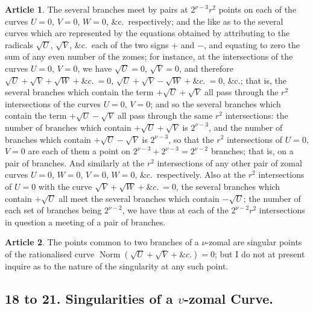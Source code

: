 \documentclass[11pt,a4paper]{article}
\theoremstyle{definition}
\newtheorem{art}{Article}
\DeclareMathOperator{\Norm}{Norm}
\newcommand{\norm}{\Norm}
\begin{document}
\begin{art}
The several branches meet by pairs at $2^{\nu-3}r^{2}$ points on each of the curves $U = 0$, $V = 0$, $W = 0$, \&c.\ respectively; and the like as to the several curves which are represented by the equations obtained by attributing to the radicals $\sqrt{U}$, $\sqrt{V}$, \&c.\ each of the two signs $+$ and $-$, and equating to zero the sum of any even number of the zomes; for instance, at the intersections of the curves $U = 0$, $V = 0$, we have $\sqrt{U} = 0$, $\sqrt{V} = 0$, and therefore $\sqrt{U} + \sqrt{V} + \sqrt{W} + \&c.\ = 0$, $\sqrt{U} + \sqrt{V} - \sqrt{W} + \&c.\ = 0$, \&c.; that is, the several branches which contain the term $+\sqrt{U} + \sqrt{V}$ all pass through the $r^{2}$ intersections of the curves $U = 0$, $V = 0$; and so the several branches which contain the term $+\sqrt{U} - \sqrt{V}$ all pass through the same $r^{2}$ intersections: the number of branches which contain $+\sqrt{U} + \sqrt{V}$ is $2^{\nu-3}$, and the number of branches which contain $+\sqrt{U} - \sqrt{V}$ is $2^{\nu-3}$, so that the $r^{2}$ intersections of $U = 0$, $V = 0$ are each of them a point on $2^{\nu-3} + 2^{\nu-3} = 2^{\nu-2}$ branches; that is, on a pair of branches. And similarly at the $r^{2}$ intersections of any other pair of zomal curves $U = 0$, $W = 0$, $V = 0$, $W = 0$, \&c.\ respectively. Also at the $r^{2}$ intersections of $U = 0$ with the curve $\sqrt{V} + \sqrt{W} + \&c.\ = 0$, the several branches which contain $+\sqrt{U}$ all meet the several branches which contain $-\sqrt{U}$; the number of each set of branches being $2^{\nu-2}$, we have thus at each of the $2^{\nu-2}r^{2}$ intersections in question a meeting of a pair of branches.
\end{art}

\begin{art}
The points common to two branches of a $\nu$-zomal are singular points of the rationalised curve $\norm(\sqrt{U} + \sqrt{V} + \&c.) = 0$; but I do not at present inquire as to the nature of the singularity at any such point.
\end{art}

\subsection{18 to 21. Singularities of a $v$-zomal Curve.}
\end{document}
